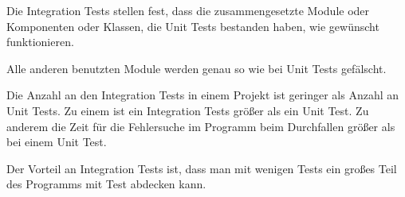 
Die Integration Tests stellen fest, dass die zusammengesetzte Module oder Komponenten oder Klassen, die Unit Tests bestanden haben, wie gewünscht funktionieren.

Alle anderen benutzten Module werden genau so wie bei Unit Tests gefälscht. 

Die Anzahl an den Integration Tests in einem Projekt ist geringer als Anzahl an Unit Tests.
Zu einem ist ein Integration Tests größer als ein Unit Test. 
Zu anderem die Zeit für die Fehlersuche im Programm beim Durchfallen größer als bei einem Unit Test.

Der Vorteil an Integration Tests ist, dass man mit wenigen Tests ein großes Teil des Programms mit Test abdecken kann.